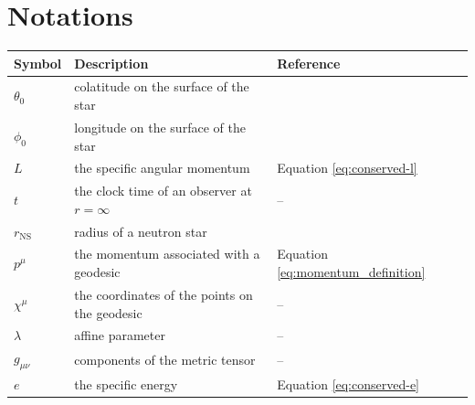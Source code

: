 \documentclass[modern]{aastex631}
\newcommand{\rNS}{r_\mathrm{NS}}
\begin{document}
\section{Notations}
\begin{table}[]
    \begin{tabular}{lll}
    \hline
    \textbf{Symbol}                   & \textbf{Description}                                                                & \textbf{Reference}                                        \\ \hline
    $\theta_0$                        & colatitude on the surface of the star                                                &                                                         \\
    $\phi_0$                          & longitude on the surface of the star                                                 &                                                         \\
    $L$                              & the specific angular momentum                                                        & Equation \ref{eq:conserved-l}                           \\
    $t$                              & the clock time of an observer at $r=\infty$                                            & --                                                      \\
    $\rNS$                           & radius of a neutron star                                                             &                                                         \\
    $p^\mu$                          & the momentum associated with a geodesic                                              & Equation \ref{eq:momentum_definition}                   \\
    $\chi^\mu$                       & the coordinates of the points on the geodesic                                        & --                                                      \\
    $\lambda$                        & affine parameter                                                                     & --                                                      \\
    $g_{\mu\nu}$                     & components of the metric tensor                                                      & --                                                      \\
    $e$                              & the specific energy                                                                  & Equation \ref{eq:conserved-e}                           \\

\end{tabular}
\end{table}
\end{document}
